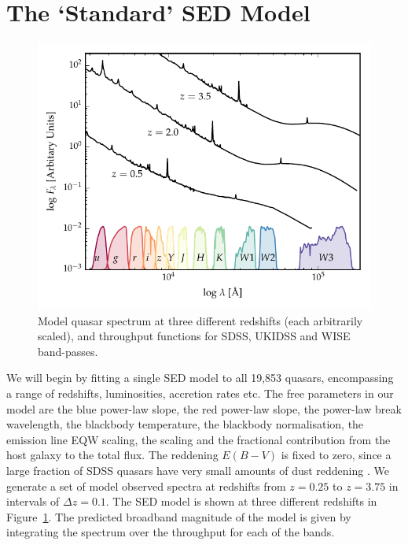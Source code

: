 \section{The `Standard' \ac{SED} Model} 


\begin{figure}
  \centering
  \includegraphics[width=\textwidth]{figures/chapter05/throughput.pdf}
  \caption{Model quasar spectrum at three different redshifts (each arbitrarily scaled), and throughput functions for SDSS, UKIDSS and WISE band-passes.}
  \label{fig:filters}
\end{figure}

We will begin by fitting a single \ac{SED} model to all 19,853 quasars, encompassing a range of redshifts, luminosities, accretion rates etc. 
The free parameters in our model are the blue power-law slope, the red power-law slope, the power-law break wavelength, the blackbody temperature, the blackbody normalisation, the emission line \ac{EQW} scaling, the \ha scaling and the fractional contribution from the host galaxy to the total flux. 
The reddening $E(B-V)$ is fixed to zero, since a large fraction of \ac{SDSS} quasars have very small amounts of dust reddening \citep{richards03}. 
We generate a set of model observed spectra at redshifts from $z=0.25$ to $z=3.75$ in intervals of $\Delta z = 0.1$. 
The \ac{SED} model is shown at three different redshifts in Figure~\ref{fig:filters}. 
The predicted broadband magnitude of the model is given by integrating the spectrum over the throughput for each of the bands.  

